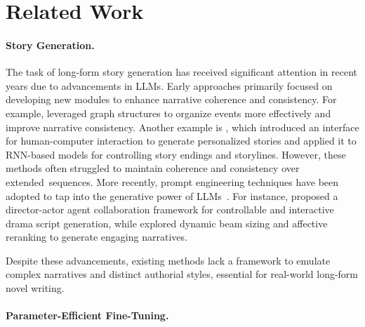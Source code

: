\section{Related Work}
\paragraph{Story Generation.}
The task of long-form story generation has received significant attention in recent years due to advancements in LLMs.
Early approaches primarily focused on developing new modules to enhance narrative coherence and consistency.
For example, \citet{ammanabrolu, Fan2019,fan2018hierarchical} leveraged graph structures to organize events more effectively and improve narrative consistency. 
Another example is \citet{peng2018towards}, which introduced an interface for human-computer interaction to generate personalized stories and applied it to RNN-based models for controlling story endings and storylines.
However, these methods often struggled to maintain coherence and consistency over extended~sequences.
More recently, prompt engineering techniques have been adopted to tap into the generative power of LLMs~\cite{giray2023prompt}.
For instance, \citet{han-etal-2024-ibsen} proposed a director-actor agent collaboration framework for controllable and interactive drama script generation, while \citet{huang2023affective} explored dynamic beam sizing and affective reranking to generate engaging narratives.

Despite these advancements, existing methods lack a framework to emulate complex narratives and distinct authorial styles, essential for real-world long-form novel writing.



\paragraph{Parameter-Efficient Fine-Tuning.}

